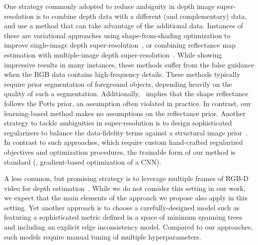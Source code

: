 One strategy commonly adopted to reduce ambiguity in depth image super-resolution is to combine depth data with a different (and complementary) data, and use a method that can take advantage of the additional data.  Instances of these are variational approaches using shape-from-shading optimization to improve single-image depth super-resolution~\cite{haefner2018fight}, or combining reflectance map estimation with multiple-image depth super-resolution~\cite{peng2017depth}.
While showing impressive results in many instances, these methods suffer from the false guidance when the RGB data contains high-frequency details. These methods typically require prior segmentation of foreground objects, depending heavily on the quality of such a segmentation. Additionally,~\cite{haefner2018fight} implies that the shape reflectance follows the Potts prior, an assumption often violated in practice. In contrast, our learning-based method makes no assumptions on the reflectance prior.
Another strategy to tackle ambiguities in super-resolution is to design sophisticated regularizers to balance the data-fidelity terms against a structural image prior~\cite{ham2018robust,jiang2018depth,yang2014color}.
In contrast to such approaches, which require custom hand-crafted regularized objectives and optimization procedures, the trainable form of our method is standard (\ie, gradient-based optimization of a CNN).

A less common, but promising  strategy is to leverage multiple frames of RGB-D video for depth estimation~\cite{tsuchiya2017depth}. While we do not consider this setting in our work, we expect that the main elements of the approach we propose also apply in this setting. 
Yet another approach is to choose a carefully-designed model such as~\cite{zuo2018minimum}
featuring a sophisticated metric defined in a space of minimum spanning trees and including an explicit edge inconsistency model. Compared to our approaches, such models require manual tuning of multiple hyperparameters.
